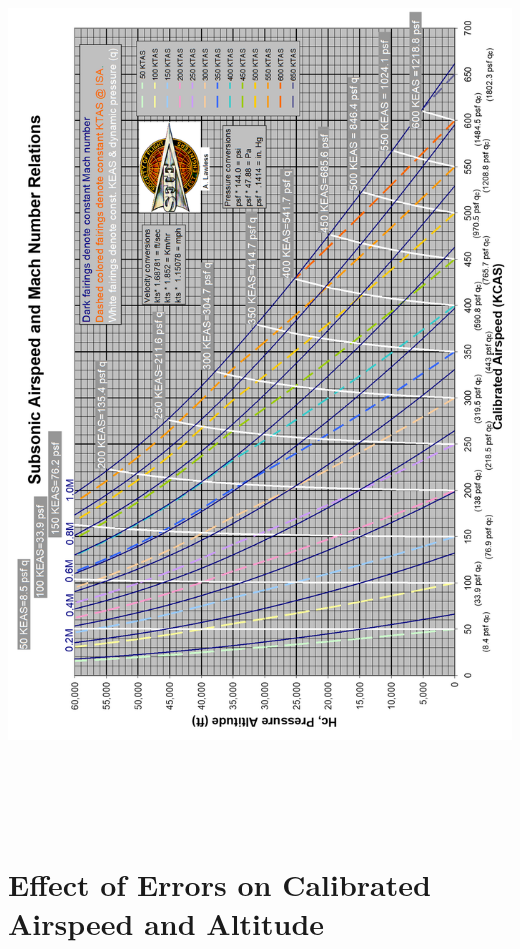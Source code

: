 \documentclass[
]{book}
\begin{document}
\includegraphics[width=6.42153in,height=9.31667in]{media/04/image54.png}

\hypertarget{effect-of-errors-on-calibrated-airspeed-and-altitude}{%
\section{Effect of Errors on Calibrated Airspeed and Altitude}\label{effect-of-errors-on-calibrated-airspeed-and-altitude}}
\end{document}
